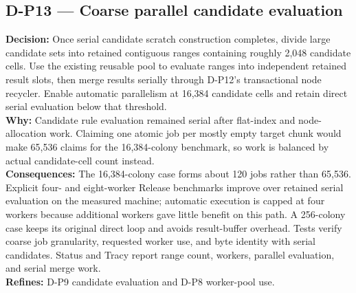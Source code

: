 \subsection*{D-P13 --- Coarse parallel candidate evaluation}
\begin{decisionbox}[title={D-P13 \quad 2026-08-08}]
\textbf{Decision:} Once serial candidate scratch construction completes, divide
large candidate sets into retained contiguous ranges containing roughly 2,048
candidate cells. Use the existing reusable pool to evaluate ranges into
independent retained result slots, then merge results serially through D-P12's
transactional node recycler. Enable automatic parallelism at 16,384 candidate
cells and retain direct serial evaluation below that threshold.\\
\textbf{Why:} Candidate rule evaluation remained serial after flat-index and
node-allocation work. Claiming one atomic job per mostly empty target chunk would
make 65,536 claims for the 16,384-colony benchmark, so work is balanced by actual
candidate-cell count instead.\\
\textbf{Consequences:} The 16,384-colony case forms about 120 jobs rather than
65,536. Explicit four- and eight-worker Release benchmarks improve over retained
serial evaluation on the measured machine; automatic execution is capped at
four workers because additional workers gave little benefit on this path. A
256-colony case keeps its original direct loop and avoids result-buffer overhead.
Tests verify coarse job granularity, requested worker use, and byte identity with
serial candidates. Status and Tracy report range count, workers, parallel
evaluation, and serial merge work.\\
\textbf{Refines:} D-P9 candidate evaluation and D-P8 worker-pool use.
\end{decisionbox}

